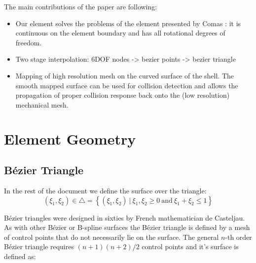 \documentclass{egpubl}
\begin{document}
The main contributions of the paper are following:
\begin{itemize}
    \item Our element solves the problems of the element presented by Comas
        \cite{Comas2010c}: it is continuous on the element boundary and has
        all rotational degrees of freedom.

    \item Two stage interpolation: 6DOF nodes -> bezier points -> bezier
        triangle


    \item Mapping of high resolution mesh on the curved surface of the
        shell. The smooth mapped surface can be used for collision
        detection and allows the propagation of proper collision response
        back onto the (low resolution) mechanical mesh.

\end{itemize}



\section{Element Geometry} %

\subsection{B\'ezier Triangle} %

In the rest of the document we define the surface over the triangle:
\begin{equation}
    (\xi_1,\xi_2) \in \bigtriangleup = \left\{ (\xi_1,\xi_2)~|~\xi_1, \xi_2 \ge 0
        \mathrm{~and~} \xi_1+\xi_2 \le 1 \right\}
\end{equation}

B\'ezier triangles were designed in sixties by French mathematician de
Casteljau. As with other B\'ezier or B-spline surfaces the B\'ezier triangle is
defined by a mesh of control points that do not necessarily lie on the
surface. The general $n$-th order B\'ezier triangle requires $(n + 1)(n +
2)/2$ control points and it's surface is defined as:
\end{document}
